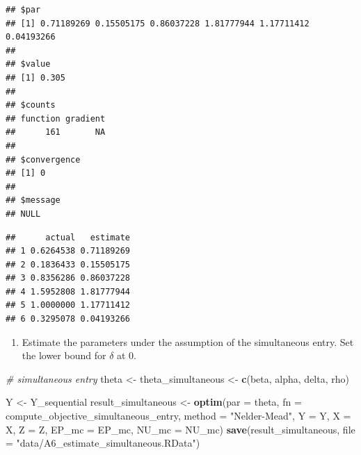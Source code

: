 \documentclass[]{book}
\newenvironment{Shaded}{\begin{snugshade}}{\end{snugshade}}
\newcommand{\KeywordTok}[1]{\textcolor[rgb]{0.13,0.29,0.53}{\textbf{#1}}}
\newcommand{\DataTypeTok}[1]{\textcolor[rgb]{0.13,0.29,0.53}{#1}}
\newcommand{\StringTok}[1]{\textcolor[rgb]{0.31,0.60,0.02}{#1}}
\newcommand{\CommentTok}[1]{\textcolor[rgb]{0.56,0.35,0.01}{\textit{#1}}}
\newcommand{\OperatorTok}[1]{\textcolor[rgb]{0.81,0.36,0.00}{\textbf{#1}}}
\newcommand{\NormalTok}[1]{#1}
\providecommand{\tightlist}{%
  \setlength{\itemsep}{0pt}\setlength{\parskip}{0pt}}
\begin{document}
\begin{verbatim}
## $par
## [1] 0.71189269 0.15505175 0.86037228 1.81777944 1.17711412 0.04193266
## 
## $value
## [1] 0.305
## 
## $counts
## function gradient 
##      161       NA 
## 
## $convergence
## [1] 0
## 
## $message
## NULL
\end{verbatim}

\begin{Shaded}
\end{Shaded}

\begin{verbatim}
##      actual   estimate
## 1 0.6264538 0.71189269
## 2 0.1836433 0.15505175
## 3 0.8356286 0.86037228
## 4 1.5952808 1.81777944
## 5 1.0000000 1.17711412
## 6 0.3295078 0.04193266
\end{verbatim}

\begin{enumerate}
\def\labelenumi{\arabic{enumi}.}
\setcounter{enumi}{6}
\tightlist
\item
  Estimate the parameters under the assumption of the simultaneous
  entry. Set the lower bound for \(\delta\) at 0.
\end{enumerate}

\begin{Shaded}
\begin{Highlighting}[]
\CommentTok{# simultaneous entry}
\NormalTok{theta <-}\StringTok{ }\NormalTok{theta_simultaneous <-}
\StringTok{  }\KeywordTok{c}\NormalTok{(beta, alpha, delta, rho)}
\end{Highlighting}
\end{Shaded}

\begin{Shaded}
\begin{Highlighting}[]
\NormalTok{Y <-}\StringTok{ }\NormalTok{Y_sequential}
\NormalTok{result_simultaneous <-}
\StringTok{  }\KeywordTok{optim}\NormalTok{(}\DataTypeTok{par =}\NormalTok{ theta,}
        \DataTypeTok{fn =}\NormalTok{ compute_objective_simultaneous_entry,}
        \DataTypeTok{method =} \StringTok{"Nelder-Mead"}\NormalTok{,}
        \DataTypeTok{Y =}\NormalTok{ Y,}
        \DataTypeTok{X =}\NormalTok{ X,}
        \DataTypeTok{Z =}\NormalTok{ Z,}
        \DataTypeTok{EP_mc =}\NormalTok{ EP_mc,}
        \DataTypeTok{NU_mc =}\NormalTok{ NU_mc)}
\KeywordTok{save}\NormalTok{(result_simultaneous, }\DataTypeTok{file =} \StringTok{"data/A6_estimate_simultaneous.RData"}\NormalTok{)}
\end{Highlighting}
\end{Shaded}
\end{document}
